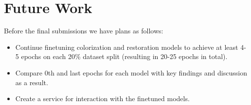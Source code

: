 \documentclass{article}
\begin{document}
\section{Future Work}
\par Before the final submissions we have plans as follows:

\begin{itemize}
    \item Continue finetuning colorization and restoration models to achieve at least 4-5 epochs on each 20\% dataset split (resulting in 20-25 epochs in total).
    \item Compare 0th and last epochs for each model with key findings and discussion as a result.
    \item Create a service for interaction with the finetuned models.
\end{itemize}
\end{document}

